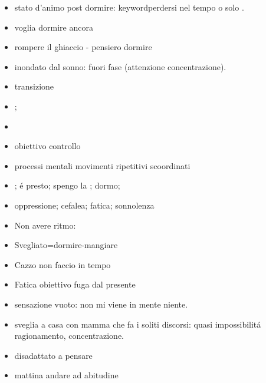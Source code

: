 \begin{itemize}

\item stato d'animo post dormire:   keyword{perdersi nel tempo} o solo  .

\item voglia dormire ancora

\item rompere il ghiaccio - pensiero dormire

\item inondato dal sonno: fuori fase (attenzione concentrazione).

\item transizione

\item {} ;

\item {} 

\item obiettivo controllo

\item processi mentali movimenti ripetitivi scoordinati

\item {}; \'e presto; spengo la ; dormo;

\item oppressione; cefalea; fatica; sonnolenza

\item Non avere ritmo:

\item Svegliato=dormire-mangiare

\item Cazzo non faccio in tempo

\item Fatica obiettivo fuga dal presente

\item sensazione vuoto: non mi viene in mente niente.

\item sveglia a casa con mamma che fa i soliti discorsi: quasi impossibilit\'a ragionamento, concentrazione.

\item disadattato a pensare

\item mattina andare ad abitudine


\end{itemize}
